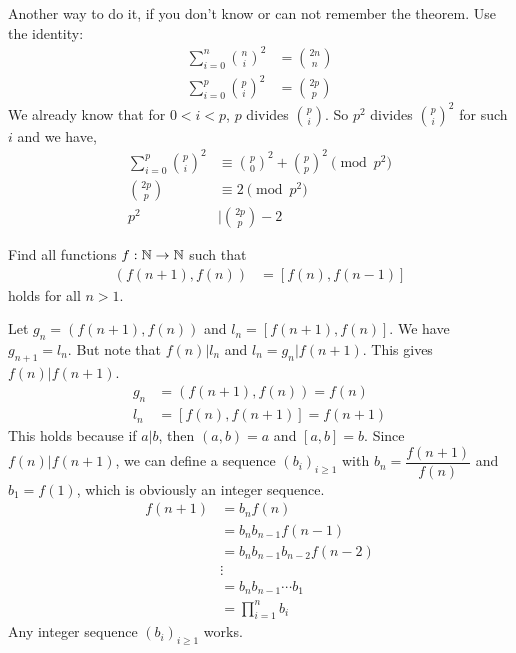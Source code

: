 \documentclass[problems.tex]{subfile}
\begin{document}
	\begin{remark}
		Another way to do it, if you don't know or can not remember the theorem. Use the identity:
			\begin{align*}
				\sum_{i=0}^{n}\binom ni^2 & = \binom{2n}{n}\\
				\sum_{i=0}^{p}\binom pi^2 & = \binom{2p}p
			\end{align*}
		We already know that for $0<i<p$, $p$ divides $\binom pi$. So $p^2$ divides $\binom pi^2$ for such $i$ and we have,
			\begin{align*}
				\sum_{i=0}^{p} \binom{p}{i}^2& \equiv \binom{p}0^2+\binom pp^2\pmod {p^2}\\
				\binom{2p}p & \equiv2\pmod{p^2}\\
				p^2 & | \binom{2p}p-2
			\end{align*}
	\end{remark}
	
	\begin{problem}
		Find all functions $f:\mathbb{N}\to\mathbb{N}$ such that
			\begin{align*}
				(f(n+1),f(n)) & = [f(n),f(n-1)]
			\end{align*}
		holds for all $n>1$.
	\end{problem}
	
	\begin{solution}
		Let $g_n=(f(n+1),f(n))$ and $l_n=[f(n+1),f(n)]$. We have $g_{n+1} = l_n$. But note that $f(n)|l_n$ and $l_n=g_n|f(n+1)$. This gives $f(n)|f(n+1)$.
			\begin{align*}
				g_n & =(f(n+1),f(n))=f(n)\\
				l_n & =[f(n),f(n+1)]=f(n+1)
			\end{align*}
		This holds because if $a|b$, then $(a,b)=a$ and $[a,b]=b$. Since $f(n)|f(n+1)$, we can define a sequence $(b_i)_{i\geq1}$ with $b_n=\dfrac{f(n+1)}{f(n)}$ and $b_1=f(1)$, which is obviously an integer sequence.
			\begin{align*}
				f(n+1)  & = b_nf(n)\\
						& = b_nb_{n-1}f(n-1)\\
						& = b_nb_{n-1}b_{n-2}f(n-2)\\
						&  \vdots\\
						& = b_nb_{n-1}\cdots b_1\\
						& = \prod_{i=1}^{n}b_i
			\end{align*}
		Any integer sequence $(b_i)_{i\geq1}$ works.
	\end{solution}
	
\end{document}
